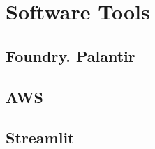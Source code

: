 \section{Software Tools}
    \subsection{Foundry. Palantir}
    \subsection{AWS}
    \subsection{Streamlit}